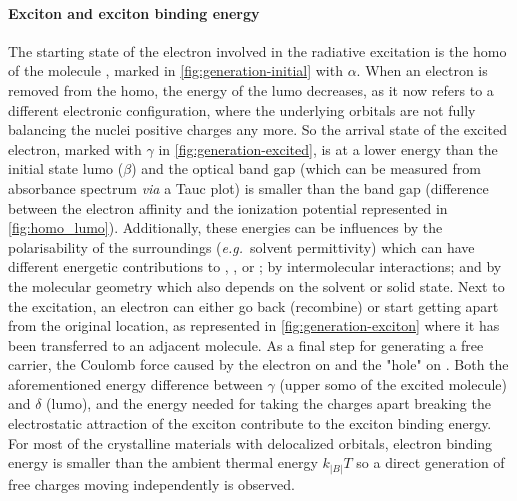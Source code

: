 		\paragraph{Exciton and exciton binding energy}\label{intro_exciton}
		The starting state of the electron involved in the radiative excitation is the \gls{homo} of the molecule , marked in \cref{fig:generation-initial} with $\alpha$.
		When an electron is removed from the \gls{homo}, the energy of the \gls{lumo} decreases, as it now refers to a different electronic configuration, where the underlying orbitals are not fully balancing the nuclei positive charges any more.
		So the arrival state of the excited electron, marked with $\gamma$ in \cref{fig:generation-excited}, is at a lower energy than the initial state \gls{lumo} ($\beta$) and the optical band gap (which can be measured from absorbance spectrum \textsl{via} a Tauc plot) is smaller than the band gap (difference between the electron affinity and the ionization potential represented in \cref{fig:homo_lumo}).
		Additionally, these energies can be influences by the polarisability of the surroundings (\textsl{e.g.}\ solvent permittivity) which can have different energetic contributions to , , or ; by intermolecular interactions; and by the molecular geometry which also depends on the solvent or solid state.
		Next to the excitation, an electron can either go back (recombine) or start getting apart from the original location, as represented in \cref{fig:generation-exciton} where it has been transferred to an adjacent molecule.
		As a final step for generating a free carrier, the Coulomb force caused by the electron on  and the "hole" on .
		Both the aforementioned energy difference between $\gamma$ (upper \gls{somo} of the excited molecule) and $\delta$ (\gls{lumo}), and the energy needed for taking the charges apart breaking the electrostatic attraction of the exciton contribute to the exciton binding energy.
		For most of the crystalline materials with delocalized orbitals, electron binding energy is smaller than the ambient thermal energy $k_|B|T$ so a direct generation of free charges moving independently is observed.

